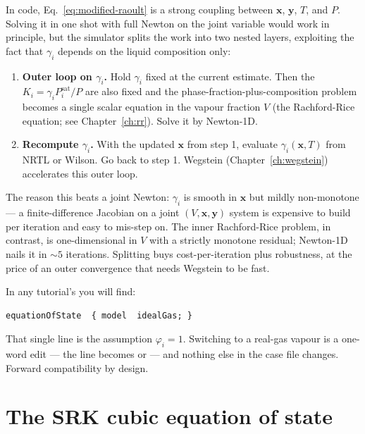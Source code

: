 \documentclass[11pt,a4paper]{article}
\begin{document}
In code, Eq.~\eqref{eq:modified-raoult} is a strong coupling between
$\mathbf{x}$, $\mathbf{y}$, $T$, and $P$.  Solving it in one shot
with full Newton on the joint variable would work in principle, but
the simulator splits the work into two nested layers, exploiting
the fact that $\gamma_i$ depends on the liquid composition only:

\begin{enumerate}[leftmargin=*,nosep]
  \item \textbf{Outer loop on $\gamma_i$.}  Hold $\gamma_i$ fixed
        at the current estimate.  Then the $K_i = \gamma_i
        P_i^{\mathrm{sat}}/P$ are also fixed and the
        phase-fraction-plus-composition problem becomes a single
        scalar equation in the vapour fraction $V$ (the
        Rachford-Rice equation; see Chapter~\ref{ch:rr}).  Solve it
        by Newton-1D.
  \item \textbf{Recompute $\gamma_i$.}  With the updated $\mathbf{x}$
        from step 1, evaluate $\gamma_i(\mathbf{x}, T)$ from NRTL or
        Wilson.  Go back to step 1.  Wegstein
        (Chapter~\ref{ch:wegstein}) accelerates this outer loop.
\end{enumerate}

The reason this beats a joint Newton: $\gamma_i$ is smooth in
$\mathbf{x}$ but mildly non-monotone --- a finite-difference
Jacobian on a joint $(V, \mathbf{x}, \mathbf{y})$ system is
expensive to build per iteration and easy to mis-step on.  The
inner Rachford-Rice problem, in contrast, is one-dimensional in
$V$ with a strictly monotone residual; Newton-1D nails it in
$\sim 5$ iterations.  Splitting buys cost-per-iteration plus
robustness, at the price of an outer convergence that needs Wegstein
to be fast.

\begin{tutoriallink}
In any tutorial's  you will find:
\begin{lstlisting}
equationOfState  { model  idealGas; }
\end{lstlisting}
That single line is the assumption $\varphi_i = 1$.  Switching to a
real-gas vapour is a one-word edit --- the line becomes  or  --- and nothing else in the case file
changes.  Forward compatibility by design.
\end{tutoriallink}

\section{The SRK cubic equation of state}\label{ch:cubic-eos}
\end{document}
